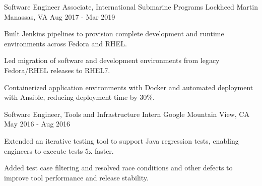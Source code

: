 \begin{cventries}
  \cventry
    {Software Engineer Associate, International Submarine Programs} %
    {Lockheed Martin} %
    {Manassas, VA} %
    {Aug 2017 - Mar 2019} %
    {
      \begin{cvitems} %
        \item {Built Jenkins pipelines to provision complete development and runtime environments across Fedora and RHEL.}
        \item {Led migration of software and development environments from legacy Fedora/RHEL releases to RHEL7.}
        \item {Containerized application environments with Docker and automated deployment with Ansible, reducing deployment time by 30\%.}
      \end{cvitems}
    }

  \cventry
    {Software Engineer, Tools and Infrastructure Intern} %
    {Google} %
    {Mountain View, CA} %
    {May 2016 - Aug 2016} %
    {
      \begin{cvitems} %
        \item {Extended an iterative testing tool to support Java regression tests, enabling engineers to execute tests 5x faster.}
        \item {Added test case filtering and resolved race conditions and other defects to improve tool performance and release stability.}
      \end{cvitems}
    }


\end{cventries}

